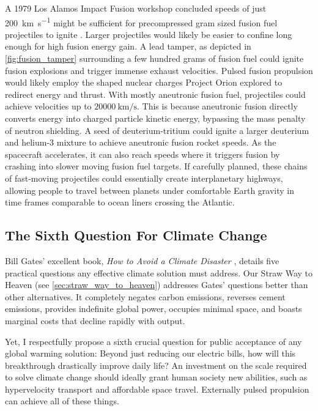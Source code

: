 \documentclass{article}
\begin{document}
A 1979 Los Alamos Impact Fusion workshop concluded speeds of just \SI{200}{\kilo\meter\per\second} might be sufficient for precompressed gram sized fusion fuel projectiles to ignite \cite{impactfusion1979}.   Larger projectiles would likely be easier to confine long enough for high fusion energy gain.   A lead tamper, as depicted in \autoref{fig:fusion_tamper} surrounding a few hundred grams of fusion fuel could ignite fusion explosions and trigger immense exhaust velocities.  Pulsed fusion propulsion would likely employ the shaped nuclear charges Project Orion explored to redirect energy and thrust.  
With mostly aneutronic fusion fuel, projectiles could achieve velocities up to $\SI{20000}{\kilo\meter\per\second}$.  This is because aneutronic fusion directly converts energy into charged particle kinetic energy, bypassing the mass penalty of neutron shielding.  A seed of deuterium-tritium could ignite a larger deuterium and helium-3 mixture to achieve aneutronic fusion rocket speeds.   As the spacecraft accelerates, it can also reach speeds where it triggers fusion by crashing into slower moving fusion fuel targets.   If carefully planned, these chains of fast-moving projectiles could essentially create interplanetary highways, allowing people to travel between planets under comfortable Earth gravity in time frames comparable to ocean liners crossing the Atlantic.  

\subsection{The Sixth Question For Climate Change}\label{sec:sith_question}
Bill Gates' excellent book, \textit{How to Avoid a Climate Disaster} \cite{gates2021avoid}, details five practical questions \cite{breakthroughenergy_2021_five} any effective climate solution must address. Our Straw Way to Heaven (see \autoref{sec:straw_way_to_heaven}) addresses Gates' questions better than other alternatives. It completely negates carbon emissions, reverses cement emissions, provides indefinite global power, occupies minimal space, and boasts marginal costs that decline rapidly with output.

Yet, I respectfully propose a sixth crucial question for public acceptance of any global warming solution: Beyond just reducing our electric bills, how will this breakthrough drastically improve daily life? An investment on the scale required to solve climate change should ideally grant human society new abilities, such as hypervelocity transport and affordable space travel. Externally pulsed propulsion can achieve all of these things.  
\end{document}
